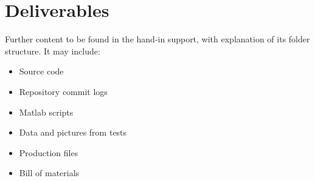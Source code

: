 \chapter{Deliverables}\label{app:deliv}

Further content to be found in the hand-in support, with explanation of its folder structure.
It may include:

\begin{itemize}
\item Source code
\item Repository commit logs
\item Matlab scripts
\item Data and pictures from tests
\item Production files
\item Bill of materials
\end{itemize}

